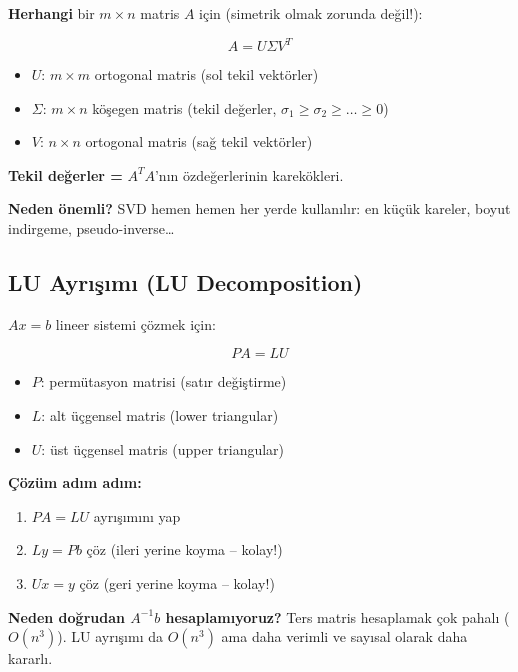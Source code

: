 \documentclass[12pt,a4paper]{article}
\theoremstyle{definition}
\theoremstyle{remark}
\begin{document}
\textbf{Herhangi} bir $m \times n$ matris $A$ i\c{c}in (simetrik olmak zorunda de\u{g}il!):

\[
A = U \Sigma V^T
\]

\begin{itemize}
    \item $U$: $m \times m$ ortogonal matris (sol tekil vekt\"orler)
    \item $\Sigma$: $m \times n$ k\"o\c{s}egen matris (tekil de\u{g}erler, $\sigma_1 \geq \sigma_2 \geq \ldots \geq 0$)
    \item $V$: $n \times n$ ortogonal matris (sa\u{g} tekil vekt\"orler)
\end{itemize}

\textbf{Tekil de\u{g}erler =} $A^T A$'n{\i}n \"ozde\u{g}erlerinin karek\"okleri.

\textbf{Neden \"onemli?} SVD hemen hemen her yerde kullan{\i}l{\i}r: en k\"u\c{c}\"uk kareler, boyut indirgeme, pseudo-inverse\ldots

\subsection{LU Ayr{\i}\c{s}{\i}m{\i} (LU Decomposition)}

$Ax = b$ lineer sistemi \c{c}\"ozmek i\c{c}in:

\[
PA = LU
\]

\begin{itemize}
    \item $P$: perm\"utasyon matrisi (sat{\i}r de\u{g}i\c{s}tirme)
    \item $L$: alt \"u\c{c}gensel matris (lower triangular)
    \item $U$: \"ust \"u\c{c}gensel matris (upper triangular)
\end{itemize}

\textbf{\c{C}\"oz\"um ad{\i}m ad{\i}m:}
\begin{enumerate}
    \item $PA = LU$ ayr{\i}\c{s}{\i}m{\i}n{\i} yap
    \item $Ly = Pb$ \c{c}\"oz (ileri yerine koyma -- kolay!)
    \item $Ux = y$ \c{c}\"oz (geri yerine koyma -- kolay!)
\end{enumerate}

\textbf{Neden do\u{g}rudan $A^{-1}b$ hesaplam{\i}yoruz?} Ters matris hesaplamak \c{c}ok pahal{\i} ($O(n^3)$). LU ayr{\i}\c{s}{\i}m{\i} da $O(n^3)$ ama daha verimli ve say{\i}sal olarak daha kararl{\i}.
\end{document}
